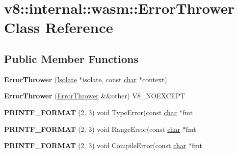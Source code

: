 \hypertarget{classv8_1_1internal_1_1wasm_1_1ErrorThrower}{}\section{v8\+:\+:internal\+:\+:wasm\+:\+:Error\+Thrower Class Reference}
\label{classv8_1_1internal_1_1wasm_1_1ErrorThrower}
\subsection*{Public Member Functions}
\begin{DoxyCompactItemize}
\item 
\mbox{\label{classv8_1_1internal_1_1wasm_1_1ErrorThrower_a40b7f5857ec747c0e182b75a8875f71e}} 
{\bfseries Error\+Thrower} (\mbox{\hyperlink{classv8_1_1internal_1_1Isolate}{Isolate}} $\ast$isolate, const \mbox{\hyperlink{classchar}{char}} $\ast$context)
\item 
\mbox{\label{classv8_1_1internal_1_1wasm_1_1ErrorThrower_a2d2503e6127ede97ee84809a219a3564}} 
{\bfseries Error\+Thrower} (\mbox{\hyperlink{classv8_1_1internal_1_1wasm_1_1ErrorThrower}{Error\+Thrower}} \&\&other) V8\+\_\+\+N\+O\+E\+X\+C\+E\+PT
\item 
\mbox{\label{classv8_1_1internal_1_1wasm_1_1ErrorThrower_aa939ac13b357d9c22c5eb2a837d7e1e4}} 
{\bfseries P\+R\+I\+N\+T\+F\+\_\+\+F\+O\+R\+M\+AT} (2, 3) void Type\+Error(const \mbox{\hyperlink{classchar}{char}} $\ast$fmt
\item 
\mbox{\label{classv8_1_1internal_1_1wasm_1_1ErrorThrower_a667a54a84f4317b3dacaa9a1c832322c}} 
{\bfseries P\+R\+I\+N\+T\+F\+\_\+\+F\+O\+R\+M\+AT} (2, 3) void Range\+Error(const \mbox{\hyperlink{classchar}{char}} $\ast$fmt
\item 
\mbox{\label{classv8_1_1internal_1_1wasm_1_1ErrorThrower_a05f155903f8d4dbbed817f61ee783fef}} 
{\bfseries P\+R\+I\+N\+T\+F\+\_\+\+F\+O\+R\+M\+AT} (2, 3) void Compile\+Error(const \mbox{\hyperlink{classchar}{char}} $\ast$fmt
\item 

\end{DoxyCompactItemize}
